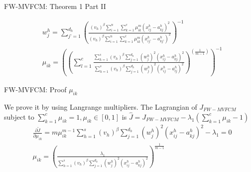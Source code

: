 \documentclass[compress,sky blue]{beamer}
\begin{document}
\begin{frame}{FW-MVFCM: Theorem 1 Part II}
	\vspace{-0.3cm}	

	
	\begin{align}
     &w_{j}^{h}  =\sum_{j’=1}^{d_{h}}\left(\frac{\left(v_{h}\right)^{\beta}\sum_{i=1}^{n}\sum_{k=1}^{c}  \mu_{ik}^{m}   \left(x_{ij}^{h}-a_{kj}^{h}\right)^2} {\left(v_{h}\right)^{\beta}\sum_{i=1}^{n}\sum_{k=1}^{c}  \mu_{ik}^{m}  \left(x_{ij’}^{h}-a_{kj’}^{h}\right)^2} \right)^{-1} \label{UpdatingW} \\
	&\mu_{ik}  =\left(\left(\sum_{l=1}^{c} \frac{\sum_{h=1}^{s}\left(v_{h}\right)^{\beta} \sum_{j=1}^{d_{h}}(w_j^{h})^2  \left(x_{ij}^{h}-a_{kj}^{h}\right)^2} {\sum_{h=1}^{s}\left(v_{h}\right)^{\beta}\sum_{j=1}^{d_{h}}(w_j^{h})^2  \left(x_{ij}^{h}-a_{lj}^{h}\right)^2} \right)^\left(\frac{1}{m-1}\right) \right)^{-1}
    \label{UpdatingU} 
	\end{align}

	
\end{frame}


\begin{frame}{FW-MVFCM: Proof $\mu_{ik}$}
	\vspace{-0.3cm}	
    
    We prove it by using Langrange multipliers. The Lagrangian of $J_{FW-MVFCM}$ subject to $\sum_{k=1}^{c}\mu_{ik}=1, \mu_{ik}\in[0,1] $ is $\hat{J}=J_{FW-MVFCM}-\lambda_{1} \left(\sum_{k=1}^{c}\mu_{ik}-1 \right)$
  \begin{align}
& \frac{\partial \tilde{J}}{\partial\mu_{ik}}=m\mu_{ik}^{m-1}\sum_{h=1}^{s}\left(v_{h}\right)^{\beta}\sum_{j=1}^{d_{h}} (w_j^{h})^2 \left(x_{ij}^{h}-a_{kj}^{h}\right)^2 - \lambda_{1}=0\\
& \mu_{ik}=\left(\frac{\lambda_{1}}{\sum_{h=1}^{s}\left(v_{h}\right)^{\beta}\sum_{j=1}^{d_{h}} (w_j^{h})^2 \left(x_{ij}^{h}-a_{kj}^{h}\right)^2 }\right)^\frac{1}{m-1}
\end{align}
	
\end{frame}
\end{document}
